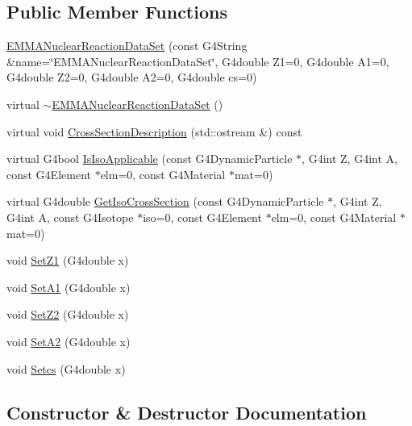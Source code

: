 \subsection*{Public Member Functions}
\begin{DoxyCompactItemize}
\item 
\hyperlink{classEMMANuclearReactionDataSet_ac6ce5688d3bb9de1d639e24b47f15245}{E\+M\+M\+A\+Nuclear\+Reaction\+Data\+Set} (const G4\+String \&name=\char`\"{}E\+M\+M\+A\+Nuclear\+Reaction\+Data\+Set\char`\"{}, G4double Z1=0, G4double A1=0, G4double Z2=0, G4double A2=0, G4double cs=0)
\item 
virtual \hyperlink{classEMMANuclearReactionDataSet_a6d3be1530811ae13198b0fa22395df7b}{$\sim$\+E\+M\+M\+A\+Nuclear\+Reaction\+Data\+Set} ()
\item 
virtual void \hyperlink{classEMMANuclearReactionDataSet_ac5aa08d400a30525da13daf02f7fa238}{Cross\+Section\+Description} (std\+::ostream \&) const 
\item 
virtual G4bool \hyperlink{classEMMANuclearReactionDataSet_adc664706b4d1ad09fdfe28a205573257}{Is\+Iso\+Applicable} (const G4\+Dynamic\+Particle $\ast$, G4int Z, G4int A, const G4\+Element $\ast$elm=0, const G4\+Material $\ast$mat=0)
\item 
virtual G4double \hyperlink{classEMMANuclearReactionDataSet_ab6e85d6188e926f67f51b6ab9d470d4c}{Get\+Iso\+Cross\+Section} (const G4\+Dynamic\+Particle $\ast$, G4int Z, G4int A, const G4\+Isotope $\ast$iso=0, const G4\+Element $\ast$elm=0, const G4\+Material $\ast$mat=0)
\item 
void \hyperlink{classEMMANuclearReactionDataSet_a3709810daaecd0ba9804357199fa0106}{Set\+Z1} (G4double x)
\item 
void \hyperlink{classEMMANuclearReactionDataSet_a7fec2b6dd1db2fe4fa136cba3cb0e4a5}{Set\+A1} (G4double x)
\item 
void \hyperlink{classEMMANuclearReactionDataSet_a82d28fec9709967f5de59028a47d0a06}{Set\+Z2} (G4double x)
\item 
void \hyperlink{classEMMANuclearReactionDataSet_a25657ad4f56aa81303d08888ea286025}{Set\+A2} (G4double x)
\item 
void \hyperlink{classEMMANuclearReactionDataSet_a609ed1be18e81560cfcfe4802388c41f}{Setcs} (G4double x)
\end{DoxyCompactItemize}


\subsection{Constructor \& Destructor Documentation}
